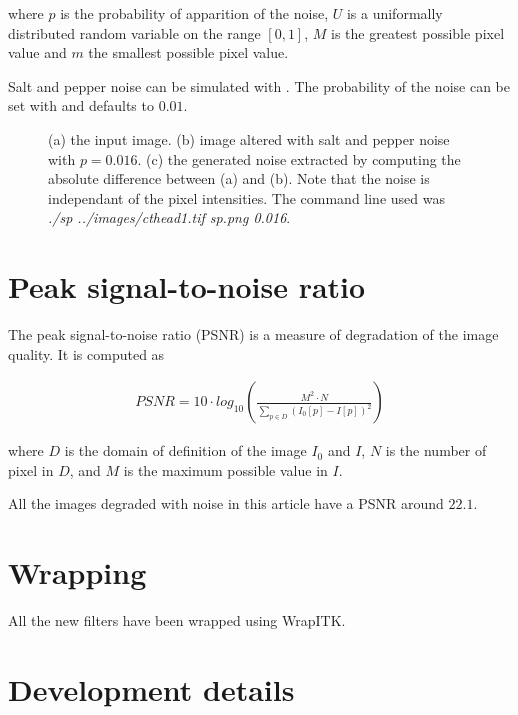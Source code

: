 \documentclass{InsightArticle}
\begin{document}
where $p$ is the probability of apparition of the noise, $U$ is a uniformally distributed
random variable on the range $[0, 1]$, $M$ is the greatest possible pixel value and $m$ the
smallest possible pixel value.

Salt and pepper noise can be simulated with . The probability
of the noise can be set with  and defaults to $0.01$.

\begin{figure}[htbp]
\begin{center}
\caption{(a) the input image. (b) image altered with salt and pepper noise with $p = 0.016$.
(c) the generated noise extracted by computing the absolute difference between (a)
and (b). Note that the noise is independant of the pixel intensities.
The command line used was {\em ./sp ../images/cthead1.tif sp.png 0.016}.}
\end{center}
\end{figure}

\section{Peak signal-to-noise ratio}

The peak signal-to-noise ratio (PSNR) is a measure of degradation of the image quality.
It is computed as

\begin{eqnarray}
PSNR = 10 \cdot log_{10}\left(\frac{M^2 \cdot N}{\underset{p \in D}{\sum} (I_0[p]-I[p])^2}\right)
\end{eqnarray}

where $D$ is the domain of definition of the image $I_0$ and $I$, $N$ is the number of pixel in $D$,
and $M$ is the maximum possible value in $I$.

All the images degraded with noise in this article have a PSNR around $22.1$.

\section{Wrapping}

All the new filters have been wrapped using WrapITK.

\section{Development details}
\end{document}
